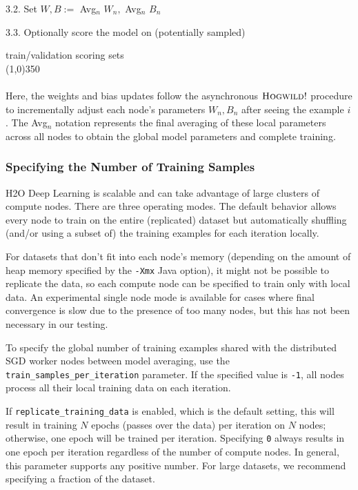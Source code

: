 \hspace{1cm} 3.2. Set $W,B := $ Avg$_n$ $W_n,$ $ $Avg$_n$ $B_n$

\hspace{1cm} 3.3. Optionally score the model on (potentially sampled) 

\hspace{1.8cm} train/validation scoring sets
\\
\line(1,0){350}
\\
\\
Here, the weights and bias updates follow the asynchronous  $\textsc{Hogwild!}$ procedure to incrementally adjust each node's parameters $W_n,B_n$ after seeing the example $i$. The Avg$_n$ notation represents the final averaging of these local parameters across all nodes to obtain the global model parameters and complete training.

\newpage
\subsubsection{Specifying the Number of Training Samples} 
\label{sssec:TrainSamplesPerIter}
H2O Deep Learning is scalable and can take advantage of large clusters of compute nodes. There are three operating modes.
The default behavior allows every node to train on the entire (replicated) dataset but automatically  shuffling (and/or using a subset of) the training examples for each iteration locally. 

For datasets that don't fit into each node's memory (depending on the amount of heap memory specified by the \texttt{-Xmx} Java %
option), it might not be possible to replicate the data, so each compute node can be specified to train only with local data. An experimental single node mode is available for cases where final convergence is slow due to the presence of too many nodes, but this has not been necessary in our testing.

To specify the global number of training examples shared with the distributed SGD worker nodes between model averaging, use the \\ \texttt{train\_samples\_per\_iteration} parameter. If the specified value is \texttt{-1}, all nodes process all their local training data on each iteration. 

If \texttt{replicate\_training\_data} is enabled, which is the default setting, this will result in training $N$ epochs (passes over the data) per iteration on $N$ nodes; otherwise, one epoch will be trained per iteration. Specifying \texttt{0} always results in one epoch per iteration regardless of the number of compute nodes. In general, this parameter supports any positive number. For large datasets, we recommend specifying a fraction of the dataset. 

